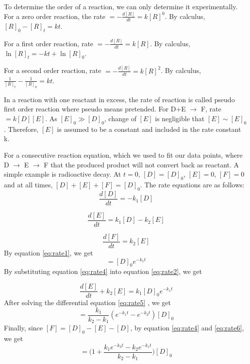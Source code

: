 To determine the order of a reaction, we can only determine it experimentally.
For a zero order reaction, the rate $ = - \frac{d[R]}{dt} = k[R]^0$. By calculus, $[R]_0 - [R]_t = kt$.

For a first order reaction, rate $ = - \frac{d[R]}{dt} = k[R]$. By calculus, $\ln [R]_t = -kt + \ln [R]_0$.

For a second order reaction, rate $ = - \frac{d[R]}{dt} = k[R]^2$. By calculus, $\frac{1}{[R]_t} - \frac{1}{[R]_0} = kt$.

In a reaction with one reactant in excess, the rate of reaction is called pseudo first order reaction where pseudo means pretended. For D+E $\rightarrow$ F, rate $ = k[D][E]$. As $[E]_0 \gg [D]_0$, change of $[E]$ is negligible that $[E] \sim [E]_0$. Therefore, $[E]$ is assumed to be a constant and included in the rate constant k.

For a consecutive reaction equation, which we used to fit our data points, where D $\rightarrow$ E $\rightarrow$ F that the produced product will not convert back as reactant. A simple example is radioactive decay. At $t=0$, $[D]=[D]_0$, $[E]=0$, $[F]=0$ and at all times, $[D]+[E]+[F]=[D]_0$. The rate equations are as follows:
\begin{equation}
\frac{ d[D]}{dt} = - k_1 [D]
\label{eq:rate1}
\end{equation}

\begin{equation}
\frac{d[E]}{dt} = k_1 [D] - k_2 [E]
\label{eq:rate2}
\end{equation}

\begin{equation}
\frac{d[F]}{dt} = k_2 [E]
\label{eq:rate3}
\end{equation}
By equation \ref{eq:rate1}, we get
\begin{equation}
[D] = [D]_0 e^{-k_1 t}
\label{eq:rate4}
\end{equation}
By substituting equation \ref{eq:rate4} into equation \ref{eq:rate2}, we get

\begin{equation}
\frac{d[E]}{dt} + k_2 [E] = k_1 [D]_0 e^{-k_1 t}
\label{eq:rate5}
\end{equation}
After solving the differential equation \ref{eq:rate5} , we get
\begin{equation}
[E] = \frac{k_1}{k_2 - k_1} (e^{-k_1 t} - e^{-k_2 t}) [D]_0
\label{eq:rate6}
\end{equation}
Finally, since $[F]=[D]_0 -[E]-[D]$, by equation \ref{eq:rate4} and \ref{eq:rate6}, we get
\begin{equation}
[F] = \Bigg( 1+ \frac{k_1 e^{-k_2 t} - k_2 e^{-k_1 t}}{k_2 - k_1} \Bigg) [D]_0
\label{eq:rate7}
\end{equation}
